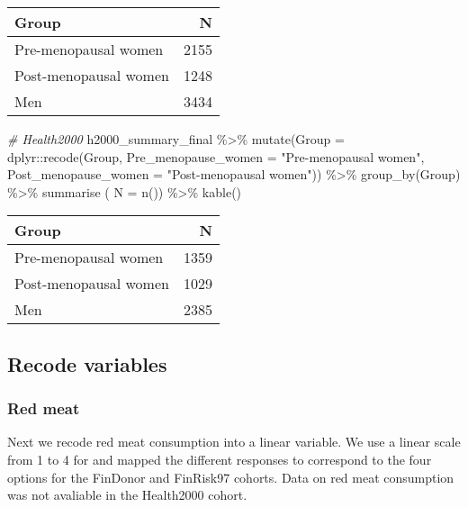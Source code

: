 \documentclass[
]{article}
\newenvironment{Shaded}{\begin{snugshade}}{\end{snugshade}}
\newcommand{\AttributeTok}[1]{\textcolor[rgb]{0.77,0.63,0.00}{#1}}
\newcommand{\CommentTok}[1]{\textcolor[rgb]{0.56,0.35,0.01}{\textit{#1}}}
\newcommand{\FunctionTok}[1]{\textcolor[rgb]{0.00,0.00,0.00}{#1}}
\newcommand{\NormalTok}[1]{#1}
\newcommand{\SpecialCharTok}[1]{\textcolor[rgb]{0.00,0.00,0.00}{#1}}
\newcommand{\StringTok}[1]{\textcolor[rgb]{0.31,0.60,0.02}{#1}}
\begin{document}
\begin{tabular}{l|r}
\hline
Group & N\\
\hline
Pre-menopausal women & 2155\\
\hline
Post-menopausal women & 1248\\
\hline
Men & 3434\\
\hline
\end{tabular}

\begin{Shaded}
\begin{Highlighting}[]
\CommentTok{\# Health2000}
\NormalTok{h2000\_summary\_final }\SpecialCharTok{\%\textgreater{}\%} 
   \FunctionTok{mutate}\NormalTok{(}\AttributeTok{Group =}\NormalTok{ dplyr}\SpecialCharTok{::}\FunctionTok{recode}\NormalTok{(Group, }\AttributeTok{Pre\_menopause\_women =} \StringTok{"Pre{-}menopausal women"}\NormalTok{,}
         \AttributeTok{Post\_menopause\_women =} \StringTok{"Post{-}menopausal women"}\NormalTok{)) }\SpecialCharTok{\%\textgreater{}\%} 
  \FunctionTok{group\_by}\NormalTok{(Group) }\SpecialCharTok{\%\textgreater{}\%} 
  \FunctionTok{summarise}\NormalTok{ ( }\AttributeTok{N =} \FunctionTok{n}\NormalTok{()) }\SpecialCharTok{\%\textgreater{}\%} 
  \FunctionTok{kable}\NormalTok{() }
\end{Highlighting}
\end{Shaded}

\begin{tabular}{l|r}
\hline
Group & N\\
\hline
Pre-menopausal women & 1359\\
\hline
Post-menopausal women & 1029\\
\hline
Men & 2385\\
\hline
\end{tabular}

\hypertarget{recode-variables}{%
\subsection{Recode variables}\label{recode-variables}}

\hypertarget{red-meat}{%
\subsubsection{Red meat}\label{red-meat}}

Next we recode red meat consumption into a linear variable. We use a
linear scale from 1 to 4 for and mapped the different responses to
correspond to the four options for the FinDonor and FinRisk97 cohorts.
Data on red meat consumption was not avaliable in the Health2000 cohort.
\end{document}
